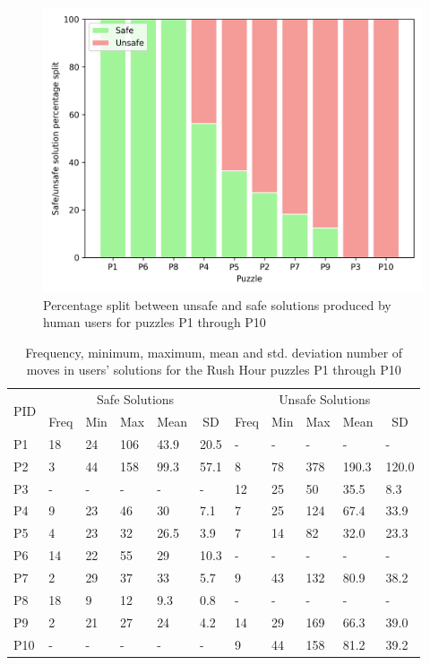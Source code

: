 \documentclass[doctor]{thesis} %
\theoremstyle{plain}
\begin{document}
\begin{figure}[htb]
  \centering
\includegraphics[width=0.5\columnwidth]{img/p2.png}
  \caption{Percentage split between unsafe and safe solutions produced by human users for puzzles P1 through P10}
  \label{fig:split}
\end{figure}
\begin{table}[htb]
\begin{tabular}{|l|l|l|l|l|l|l|l|l|l|l|}
\hline
\multicolumn{1}{|c|}{\multirow{2}{*}{PID}} &
  \multicolumn{5}{c|}{Safe Solutions} &
  \multicolumn{5}{c|}{Unsafe Solutions} \\ \cline{2-11} 
\multicolumn{1}{|c|}{} &
  \multicolumn{1}{c|}{Freq} &
  \multicolumn{1}{c|}{Min} &
  \multicolumn{1}{c|}{Max} &
  \multicolumn{1}{c|}{Mean} &
  \multicolumn{1}{c|}{SD} &
  \multicolumn{1}{c|}{Freq} &
  \multicolumn{1}{c|}{Min} &
  \multicolumn{1}{c|}{Max} &
  \multicolumn{1}{c|}{Mean} &
  \multicolumn{1}{c|}{SD} \\ \hline
P1  & 18 & 24 & 106 & 43.9  & 20.5  & -  & -  & -   & -    & -    \\ 
P2  &  3  & 44 & 158 & 99.3 & 57.1 & 8  & 78 & 378 & 190.3 & 120.0\\ 
P3  & -  & -  & -   & -     & -     & 12 & 25 & 50  & 35.5 & 8.3  \\ 
P4  & 9  & 23 & 46  & 30    & 7.1   & 7  & 25 & 124 & 67.4 & 33.9 \\ 
P5  & 4  & 23 & 32  & 26.5  & 3.9   & 7  & 14 & 82  & 32.0 & 23.3 \\
P6  & 14 & 22 & 55  & 29    & 10.3  & -  & -  & -   & -    & -    \\
P7  & 2  & 29 & 37  & 33    & 5.7   & 9  & 43 & 132 & 80.9 & 38.2 \\ 
P8  & 18 & 9  & 12  & 9.3   & 0.8   & -  & -  & -   & -    & -    \\
P9  & 2  & 21 & 27  & 24    & 4.2   & 14 & 29 & 169 & 66.3 & 39.0 \\
P10 & -  & -  & -   & -     & -     & 9  & 44 & 158 & 81.2 & 39.2 \\ \hline
\end{tabular}
\caption{Frequency, minimum, maximum, mean and std. deviation number of moves in users' solutions for the Rush Hour puzzles P1 through P10}
\label{tab:usersolutions}
\end{table}
\end{document}
